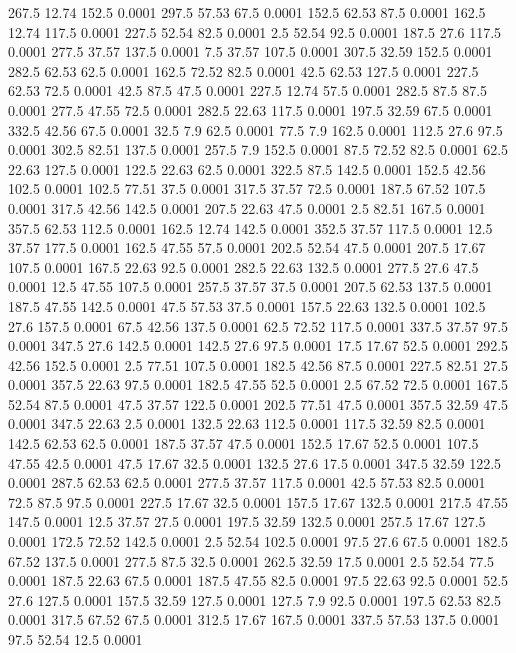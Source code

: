 267.5	12.74	152.5	0.0001
297.5	57.53	67.5	0.0001
152.5	62.53	87.5	0.0001
162.5	12.74	117.5	0.0001
227.5	52.54	82.5	0.0001
2.5	52.54	92.5	0.0001
187.5	27.6	117.5	0.0001
277.5	37.57	137.5	0.0001
7.5	37.57	107.5	0.0001
307.5	32.59	152.5	0.0001
282.5	62.53	62.5	0.0001
162.5	72.52	82.5	0.0001
42.5	62.53	127.5	0.0001
227.5	62.53	72.5	0.0001
42.5	87.5	47.5	0.0001
227.5	12.74	57.5	0.0001
282.5	87.5	87.5	0.0001
277.5	47.55	72.5	0.0001
282.5	22.63	117.5	0.0001
197.5	32.59	67.5	0.0001
332.5	42.56	67.5	0.0001
32.5	7.9	62.5	0.0001
77.5	7.9	162.5	0.0001
112.5	27.6	97.5	0.0001
302.5	82.51	137.5	0.0001
257.5	7.9	152.5	0.0001
87.5	72.52	82.5	0.0001
62.5	22.63	127.5	0.0001
122.5	22.63	62.5	0.0001
322.5	87.5	142.5	0.0001
152.5	42.56	102.5	0.0001
102.5	77.51	37.5	0.0001
317.5	37.57	72.5	0.0001
187.5	67.52	107.5	0.0001
317.5	42.56	142.5	0.0001
207.5	22.63	47.5	0.0001
2.5	82.51	167.5	0.0001
357.5	62.53	112.5	0.0001
162.5	12.74	142.5	0.0001
352.5	37.57	117.5	0.0001
12.5	37.57	177.5	0.0001
162.5	47.55	57.5	0.0001
202.5	52.54	47.5	0.0001
207.5	17.67	107.5	0.0001
167.5	22.63	92.5	0.0001
282.5	22.63	132.5	0.0001
277.5	27.6	47.5	0.0001
12.5	47.55	107.5	0.0001
257.5	37.57	37.5	0.0001
207.5	62.53	137.5	0.0001
187.5	47.55	142.5	0.0001
47.5	57.53	37.5	0.0001
157.5	22.63	132.5	0.0001
102.5	27.6	157.5	0.0001
67.5	42.56	137.5	0.0001
62.5	72.52	117.5	0.0001
337.5	37.57	97.5	0.0001
347.5	27.6	142.5	0.0001
142.5	27.6	97.5	0.0001
17.5	17.67	52.5	0.0001
292.5	42.56	152.5	0.0001
2.5	77.51	107.5	0.0001
182.5	42.56	87.5	0.0001
227.5	82.51	27.5	0.0001
357.5	22.63	97.5	0.0001
182.5	47.55	52.5	0.0001
2.5	67.52	72.5	0.0001
167.5	52.54	87.5	0.0001
47.5	37.57	122.5	0.0001
202.5	77.51	47.5	0.0001
357.5	32.59	47.5	0.0001
347.5	22.63	2.5	0.0001
132.5	22.63	112.5	0.0001
117.5	32.59	82.5	0.0001
142.5	62.53	62.5	0.0001
187.5	37.57	47.5	0.0001
152.5	17.67	52.5	0.0001
107.5	47.55	42.5	0.0001
47.5	17.67	32.5	0.0001
132.5	27.6	17.5	0.0001
347.5	32.59	122.5	0.0001
287.5	62.53	62.5	0.0001
277.5	37.57	117.5	0.0001
42.5	57.53	82.5	0.0001
72.5	87.5	97.5	0.0001
227.5	17.67	32.5	0.0001
157.5	17.67	132.5	0.0001
217.5	47.55	147.5	0.0001
12.5	37.57	27.5	0.0001
197.5	32.59	132.5	0.0001
257.5	17.67	127.5	0.0001
172.5	72.52	142.5	0.0001
2.5	52.54	102.5	0.0001
97.5	27.6	67.5	0.0001
182.5	67.52	137.5	0.0001
277.5	87.5	32.5	0.0001
262.5	32.59	17.5	0.0001
2.5	52.54	77.5	0.0001
187.5	22.63	67.5	0.0001
187.5	47.55	82.5	0.0001
97.5	22.63	92.5	0.0001
52.5	27.6	127.5	0.0001
157.5	32.59	127.5	0.0001
127.5	7.9	92.5	0.0001
197.5	62.53	82.5	0.0001
317.5	67.52	67.5	0.0001
312.5	17.67	167.5	0.0001
337.5	57.53	137.5	0.0001
97.5	52.54	12.5	0.0001
